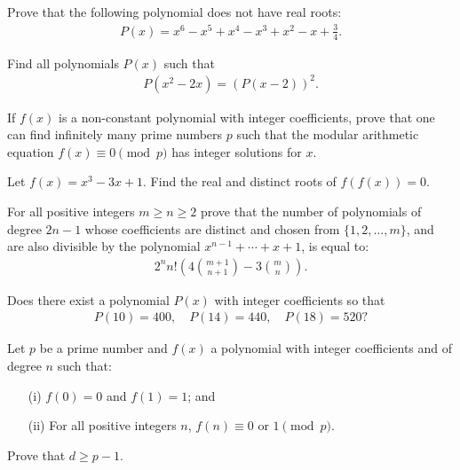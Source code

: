 \documentclass[12pt,a4paper]{memoir}
\theoremstyle{definition}
\begin{document}
\begin{question}
	Prove that the following polynomial does not have real roots:
	\begin{align*}
		P(x) = x^6 - x^5 + x^4 - x^3 + x^2 - x + \frac{3}{4}.
	\end{align*}
\end{question}



\begin{question}[name={1976 Bulgaria}]
	Find all polynomials $P(x)$ such that
	\begin{align*}
		P(x^2-2x)=(P(x-2))^2.
	\end{align*}
\end{question}

\begin{question}
	If $f(x)$ is a non-constant polynomial with integer coefficients, prove that one can find infinitely many prime numbers $p$ such that the modular arithmetic equation $f(x) \equiv 0 \pmod p$ has integer solutions for $x$.
\end{question}

\begin{question}[name={1998 Bulgaria}]
	Let $f(x)=x^3-3x+1$. Find the real and distinct roots of $f(f(x))=0$.
\end{question}


\begin{question}[name={1998 India}]
	For all positive integers $m\geq n \geq 2$ prove that the number of polynomials of degree $2n-1$ whose coefficients are distinct and chosen from $\{1,2,\dots,m\}$, and are also divisible by the polynomial $x^{n-1}+\cdots+x+1$, is equal to:
	\begin{align*}
		2^n n! \left(4\binom{m+1}{n+1}-3\binom{m}{n}\right).
	\end{align*}
\end{question}

\begin{question}[name={1999 Hungary}]
	Does there exist a polynomial $P(x)$ with integer coefficients so that
	\begin{align*}
		P(10)=400, \quad P(14)=440, \quad P(18)=520?
	\end{align*}
\end{question}



\begin{question}[name={1997 IMO Shortlist}]
	Let $p$ be a prime number and $f(x)$ a polynomial with integer coefficients and of degree $n$ such that:
	\begin{itemize}
		\item[(i)] $f(0)=0$ and $f(1)=1$; and
		\item[(ii)] For all positive integers $n$, $f(n) \equiv 0 \text{ or } 1 \pmod p$.
	\end{itemize}
	Prove that $d \geq p-1$.
\end{question}
\end{document}
